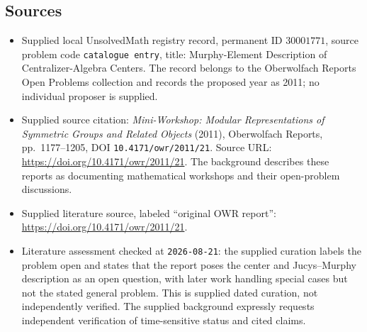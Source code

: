 \documentclass[11pt]{article}
\begin{document}
\subsection{Sources}
\begin{itemize}
\item Supplied local UnsolvedMath registry record, permanent ID \(30001771\), source problem code \texttt{catalogue entry}, title: Murphy-Element Description of Centralizer-Algebra Centers. The record belongs to the Oberwolfach Reports Open Problems collection and records the proposed year as 2011; no individual proposer is supplied.
\item Supplied source citation: \emph{Mini-Workshop: Modular Representations of Symmetric Groups and Related Objects} (2011), Oberwolfach Reports, pp.~1177--1205, DOI \texttt{10.4171/owr/2011/21}. Source URL: \url{https://doi.org/10.4171/owr/2011/21}. The background describes these reports as documenting mathematical workshops and their open-problem discussions.
\item Supplied literature source, labeled ``original OWR report'': \url{https://doi.org/10.4171/owr/2011/21}.
\item Literature assessment checked at \texttt{2026-08-21}: the supplied curation labels the problem open and states that the report poses the center and Jucys--Murphy description as an open question, with later work handling special cases but not the stated general problem. This is supplied dated curation, not independently verified. The supplied background expressly requests independent verification of time-sensitive status and cited claims.
\end{itemize}
\end{document}
